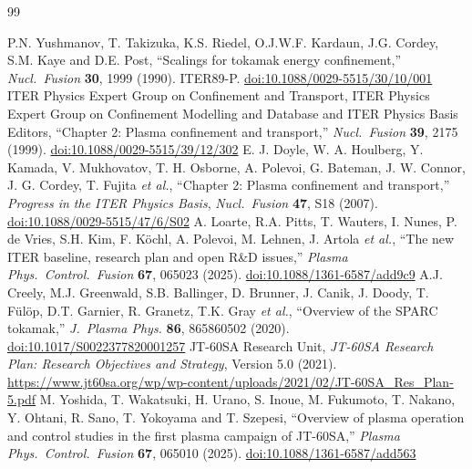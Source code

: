 \documentclass[12pt,letterpaper]{article}
\begin{document}
\begin{thebibliography}{99}
\small\setlength{\itemsep}{0pt}\setlength{\parskip}{0pt}
\raggedright
{} P.N. Yushmanov, T. Takizuka, K.S. Riedel, O.J.W.F. Kardaun, J.G. Cordey,
S.M. Kaye and D.E. Post, ``Scalings for tokamak energy
confinement,'' \emph{Nucl.\ Fusion} \textbf{30}, 1999 (1990). ITER89-P.
\href{https://doi.org/10.1088/0029-5515/30/10/001}{doi:10.1088/0029-5515/30/10/001}
 ITER Physics Expert Group on Confinement and Transport, ITER
Physics Expert Group on Confinement Modelling and Database and ITER Physics
Basis Editors, ``Chapter 2: Plasma confinement and transport,'' \emph{Nucl.\
Fusion} \textbf{39}, 2175 (1999).
\href{https://doi.org/10.1088/0029-5515/39/12/302}{doi:10.1088/0029-5515/39/12/302}
\bibitem{doyle07} E. J. Doyle, W. A. Houlberg, Y. Kamada, V. Mukhovatov, T. H. Osborne,
A. Polevoi, G. Bateman, J. W. Connor, J. G. Cordey, T. Fujita \emph{et al.},
``Chapter 2: Plasma confinement
and transport,'' \emph{Progress in the ITER Physics Basis}, \emph{Nucl.\
Fusion} \textbf{47}, S18 (2007).
\href{https://doi.org/10.1088/0029-5515/47/6/S02}{doi:10.1088/0029-5515/47/6/S02}
\bibitem{loarte} A. Loarte, R.A. Pitts, T. Wauters, I. Nunes, P. de Vries, S.H. Kim,
F. K\"{o}chl, A. Polevoi, M. Lehnen, J. Artola \emph{et al.},
``The new ITER baseline, research plan
and open R\&D issues,'' \emph{Plasma Phys.\ Control.\ Fusion} \textbf{67},
065023 (2025).
\href{https://doi.org/10.1088/1361-6587/add9c9}{doi:10.1088/1361-6587/add9c9}
 A.J. Creely, M.J. Greenwald, S.B. Ballinger, D. Brunner, J. Canik,
J. Doody, T. F\"{u}l\"{o}p, D.T. Garnier, R. Granetz, T.K. Gray \emph{et al.},
``Overview of the SPARC tokamak,''
\emph{J.\ Plasma Phys.} \textbf{86}, 865860502 (2020).
\href{https://doi.org/10.1017/S0022377820001257}{doi:10.1017/S0022377820001257}
\bibitem{jt60saplan} JT-60SA Research Unit, \emph{JT-60SA Research Plan:
Research Objectives and Strategy}, Version 5.0 (2021).
\url{https://www.jt60sa.org/wp/wp-content/uploads/2021/02/JT-60SA_Res_Plan-5.pdf}
\bibitem{jt60saop1} M. Yoshida, T. Wakatsuki, H. Urano, S. Inoue, M. Fukumoto, T. Nakano,
Y. Ohtani, R. Sano, T. Yokoyama and T. Szepesi, ``Overview of plasma operation and
control studies in the first plasma campaign of JT-60SA,'' \emph{Plasma Phys.\
Control.\ Fusion} \textbf{67}, 065010 (2025).
\href{https://doi.org/10.1088/1361-6587/add563}{doi:10.1088/1361-6587/add563}

\end{thebibliography}
\end{document}
